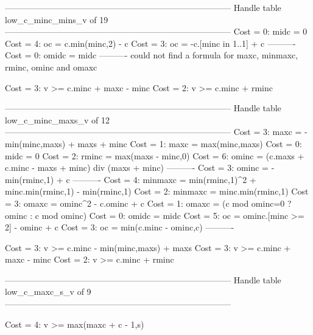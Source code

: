 --------------------------------------------------------------------------------
Handle table low_c_minc_mins_v of 19
--------------------------------------------------------------------------------
Cost =  0:  midc    = 0
Cost =  4:  oc      = c.min(minc,2) - c
Cost =  3:  oc      = -c.[minc in 1..1] + c
----------
Cost =  0:  omidc   = midc
----------
could not find a formula for maxc, minmaxc, rminc, ominc and omaxc

Cost =  3:  v >= c.minc + maxc - minc
Cost =  2:  v >= c.minc + rminc

--------------------------------------------------------------------------------
Handle table low_c_minc_maxs_v of 12
--------------------------------------------------------------------------------
Cost =  3:  maxc    = -min(minc,maxs) + maxs + minc
Cost =  1:  maxc    = max(minc,maxs)
Cost =  0:  midc    = 0
Cost =  2:  rminc   = max(maxs - minc,0)
Cost =  6:  ominc   = (c.maxs + c.minc - maxs + minc) div (maxs + minc)
----------
Cost =  3:  ominc   = -min(rminc,1) + c
----------
Cost =  4:  minmaxc = min(rminc,1)^2 + minc.min(rminc,1) - min(rminc,1)
Cost =  2:  minmaxc = minc.min(rminc,1)
Cost =  3:  omaxc   = ominc^2 - c.ominc + c
Cost =  1:  omaxc   = (c mod ominc=0 ? ominc : c mod ominc)
Cost =  0:  omidc   = midc
Cost =  5:  oc      = ominc.[minc >= 2] - ominc + c
Cost =  3:  oc      = min(c.minc - ominc,c)
----------

Cost =  3:  v >= c.minc - min(minc,maxs) + maxs
Cost =  3:  v >= c.minc + maxc - minc
Cost =  2:  v >= c.minc + rminc

--------------------------------------------------------------------------------
Handle table low_c_maxc_s_v of 9
--------------------------------------------------------------------------------

Cost =  4:  v >= max(maxc + c - 1,s)

